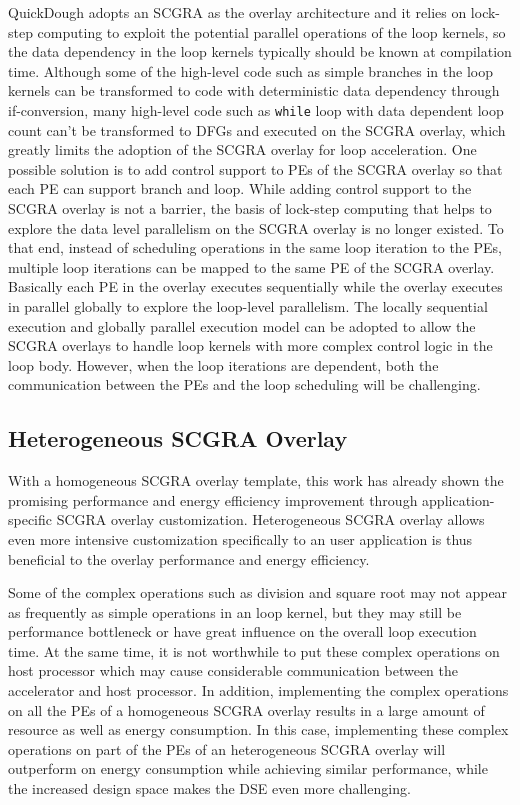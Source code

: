 QuickDough adopts an SCGRA as the overlay architecture and it relies on lock-step computing to exploit the potential parallel operations of the loop kernels, so the data dependency in the loop kernels typically should be known at compilation time. Although some of the high-level code such as simple branches in the loop kernels can be transformed to code with deterministic data dependency through if-conversion, many high-level code such as \texttt{while} loop with data dependent loop count can't be transformed to DFGs and executed on the SCGRA overlay, which greatly limits the adoption of the SCGRA overlay for loop acceleration. One possible solution is to add control support to PEs of the SCGRA overlay so that each PE can support branch and loop. While adding control support to the SCGRA overlay is not a barrier, the basis of lock-step computing that helps to explore the data level parallelism on the SCGRA overlay is no longer existed. To that end, instead of scheduling operations in the same loop iteration to the PEs, multiple loop iterations can be mapped to the same PE of the SCGRA overlay. Basically each PE in the overlay executes sequentially while the overlay executes in parallel globally to explore the loop-level parallelism. The locally sequential execution and globally parallel execution model can be adopted to allow the SCGRA overlays to handle loop kernels with more complex control logic in the loop body. However, when the loop iterations are dependent, both the communication between the PEs and the loop scheduling will be challenging.

\subsection{Heterogeneous SCGRA Overlay}
With a homogeneous SCGRA overlay template, this work has already shown the promising performance and energy efficiency improvement through application-specific SCGRA overlay customization. Heterogeneous SCGRA overlay allows even more intensive customization specifically to an user application is thus beneficial to the overlay performance and energy efficiency. 

Some of the complex operations such as division and square root may not appear as frequently as simple operations in an loop kernel, but they may still be performance bottleneck or have great influence on the overall loop execution time. At the same time, it is not worthwhile to put these complex operations on host processor which may cause considerable communication between the accelerator and host processor. In addition, implementing the complex operations on all the PEs of a homogeneous SCGRA overlay results in a large amount of resource as well as energy consumption. In this case, implementing these complex operations on part of the PEs of an heterogeneous SCGRA overlay will outperform on energy consumption while achieving similar performance, while the increased design space makes the DSE even more challenging.


